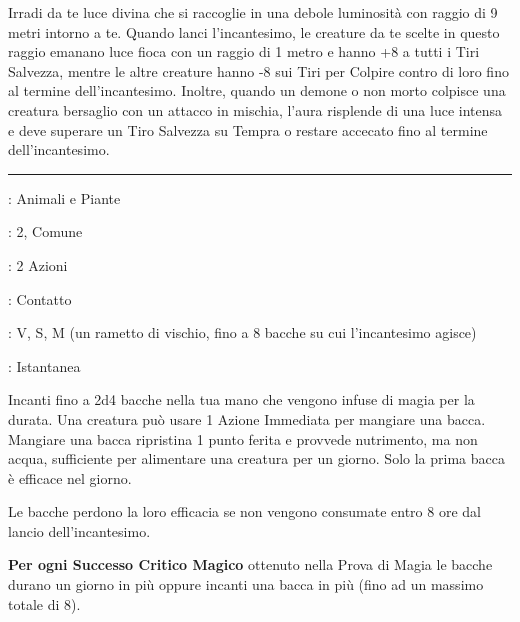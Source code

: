 \begin{multicols}{2}
Irradi da te luce divina che si raccoglie in una debole luminosità con raggio di 9 metri intorno a te. Quando lanci l'incantesimo, le creature da te scelte in questo raggio emanano luce fioca con un raggio di 1 metro e hanno +8 a tutti i Tiri Salvezza, mentre le altre creature hanno -8 sui Tiri per Colpire contro di loro fino al termine dell'incantesimo. Inoltre, quando un demone o non morto colpisce una creatura bersaglio con un attacco in mischia, l'aura risplende di una luce intensa e deve superare un Tiro Salvezza su Tempra o restare accecato fino al termine dell'incantesimo.

\smallskip\noindent\rule{\linewidth}{2pt} \hypertarget{Bacche Benefiche}{}\medskip{}
\noindent
\begin{description}[noitemsep, topsep=0pt, parsep=0pt, partopsep=0pt, leftmargin=0cm, labelwidth=2.8cm]
	\item[\textbf{Lista di Magia}]: Animali e Piante
	\item[\textbf{Livello}]: 2, Comune
	\item[\textbf{T. di Lancio}]: 2 Azioni
	\item[\textbf{Gittata}]: Contatto
	\item[\textbf{Componenti}]: V, S, M (un rametto di vischio, fino a 8 bacche su cui l'incantesimo agisce)
	\item[\textbf{Durata}]: Istantanea
\end{description}

Incanti fino a 2d4 bacche nella tua mano che vengono infuse di magia per la durata. Una creatura può usare 1 Azione Immediata per mangiare una bacca. Mangiare una bacca ripristina 1 punto ferita e provvede nutrimento, ma non acqua, sufficiente per alimentare una creatura per un giorno. Solo la prima bacca è efficace nel giorno.

Le bacche perdono la loro efficacia se non vengono consumate entro 8 ore dal lancio dell'incantesimo.

\textbf{Per ogni Successo Critico Magico} ottenuto nella Prova di Magia le bacche durano un giorno in più oppure incanti una bacca in più (fino ad un massimo totale di 8).


\end{multicols}
